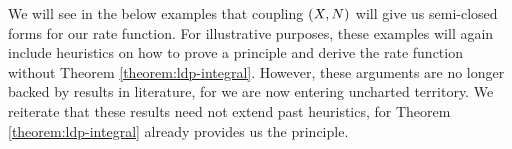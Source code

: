 We will see in the below examples that coupling $(X, N)$ will give us semi-closed forms for our rate function.
For illustrative purposes, these examples will again include heuristics on how to prove a principle and derive the rate function without Theorem \ref{theorem:ldp-integral}.
However, these arguments are no longer backed by results in literature, for we are now entering uncharted territory.
We reiterate that these results need not extend past heuristics, for Theorem \ref{theorem:ldp-integral} already provides us the principle.




